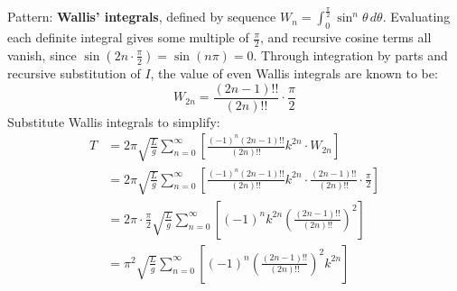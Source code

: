 \documentclass[preview]{standalone}
\begin{document}
\color{white}

Pattern: \textbf{Wallis' integrals}, defined by sequence $W_n =
\int_{0}^{\frac{\pi}{2}} \sin^n \theta \, d\theta$. Evaluating each
definite integral gives some multiple of $\frac{\pi}{2}$, and recursive cosine terms all vanish, since $\sin(2n \cdot \frac{\pi}{2}) = \sin(n\pi) = 0$. Through integration by parts and recursive
substitution of $I$, the value of even Wallis integrals are known to be:
\[
  W_{2n} = \frac{(2n-1)!!}{(2n)!!} \cdot \frac{\pi}{2}
\]
Substitute Wallis integrals to simplify:
\begin{align*}
  T &= 2\pi \sqrt{\frac{L}{g}} \sum_{n=0}^{\infty} \left[\frac{(-1)^n (2n-1)!!}{(2n)!!} k^{2n} \cdot W_{2n}\right] \\
  &= 2\pi \sqrt{\frac{L}{g}} \sum_{n=0}^{\infty} \left[\frac{(-1)^n (2n-1)!!}{(2n)!!} k^{2n} \cdot \frac{(2n-1)!!}{(2n)!!} \cdot \frac{\pi}{2}\right] \\
  &= 2\pi \cdot \frac{\pi}{2} \sqrt{\frac{L}{g}} \sum_{n=0}^{\infty} \left[(-1)^n k^{2n} \left(\frac{(2n-1)!!}{(2n)!!}\right)^2 \right] \\
  &= \boxed{\pi^2 \sqrt{\frac{L}{g}} \sum_{n=0}^{\infty} \left[(-1)^n \left(\frac{(2n-1)!!}{(2n)!!}\right)^2 k^{2n} \right]}
\end{align*}
\end{document}
